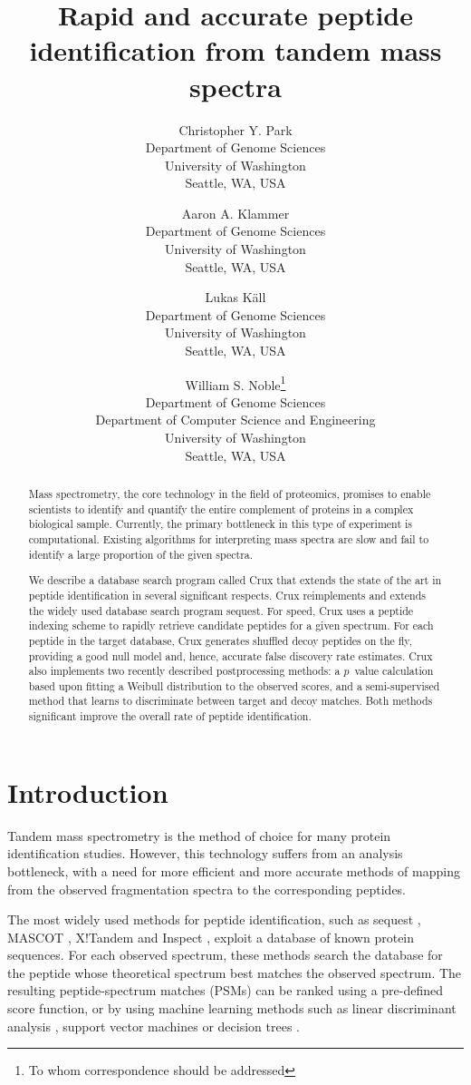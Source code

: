 \documentclass[12pt]{article}
\title{Rapid and accurate peptide identification from tandem mass
  spectra}
\author{Christopher Y. Park \\
Department of Genome Sciences\\
University of Washington\\
Seattle, WA, USA
\and
Aaron A. Klammer\\
Department of Genome Sciences\\
University of Washington\\
Seattle, WA, USA
\and
Lukas K\"{a}ll\\
Department of Genome Sciences\\
University of Washington\\
Seattle, WA, USA
\and
William S. Noble\footnote{To whom correspondence should
  be addressed}\\
Department of Genome Sciences\\
Department of Computer Science and Engineering\\
University of Washington\\
Seattle, WA, USA
}
\begin{document}
\maketitle

\begin{abstract}
Mass spectrometry, the core technology in the field of proteomics,
promises to enable scientists to identify and quantify the entire
complement of proteins in a complex biological sample.  Currently, the
primary bottleneck in this type of experiment is computational.
Existing algorithms for interpreting mass spectra are slow and fail to
identify a large proportion of the given spectra.

We describe a database search program called Crux that extends the
state of the art in peptide identification in several significant
respects.  Crux reimplements and extends the widely used database
search program {\sc sequest}.  For speed, Crux uses a peptide indexing
scheme to rapidly retrieve candidate peptides for a given spectrum.
For each peptide in the target database, Crux generates shuffled decoy
peptides on the fly, providing a good null model and, hence, accurate
false discovery rate estimates.  Crux also implements two recently
described postprocessing methods: a $p$~value calculation based upon
fitting a Weibull distribution to the observed scores, and a
semi-supervised method that learns to discriminate between target and
decoy matches.  Both methods significant improve the overall rate of
peptide identification.
\end{abstract}

\section{Introduction}

Tandem mass spectrometry is the method of choice for many protein
identification studies.  However, this technology suffers from an
analysis bottleneck, with a need for more efficient and more accurate
methods of mapping from the observed fragmentation spectra to the
corresponding peptides.

The most widely used methods for peptide identification, such as
{\sc sequest} \cite{eng:approach}, MASCOT \cite{perkins:probability},
X!Tandem \cite{craig:tandem} and Inspect \cite{tanner:inspect},
exploit a database of known protein sequences.  For each observed
spectrum, these methods search the database for the peptide whose
theoretical spectrum best matches the observed spectrum.  The
resulting peptide-spectrum matches (PSMs) can be ranked using a
pre-defined score function, or by using machine learning methods such
as linear discriminant analysis \cite{keller:empirical}, support
vector machines \cite{anderson:new, kall:semi-supervised} or decision
trees \cite{elias:intensity}.
\end{document}
